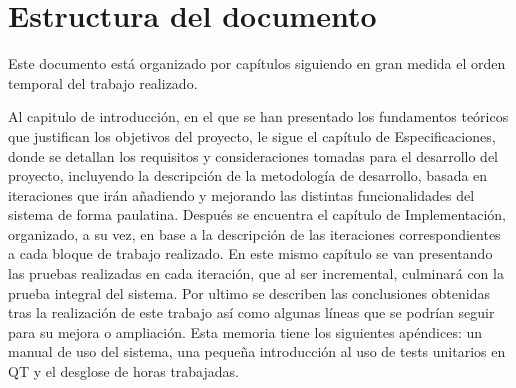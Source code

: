 \section{Estructura del documento}
Este documento está organizado por capítulos siguiendo en gran medida el orden temporal del trabajo realizado. 

Al capitulo de introducción, en el que se han presentado los fundamentos teóricos que justifican los objetivos del proyecto, le sigue el capítulo de Especificaciones, donde se detallan los requisitos y consideraciones tomadas para el desarrollo del proyecto, incluyendo la descripción de la metodología de desarrollo, basada en iteraciones que irán añadiendo y mejorando las distintas funcionalidades del sistema de forma paulatina. Después se encuentra el capítulo de Implementación, organizado, a su vez, en base a la descripción de las iteraciones correspondientes a cada bloque de trabajo realizado. En este mismo capítulo se van presentando las pruebas realizadas en cada iteración, que al ser incremental, culminará con la prueba integral del sistema. Por ultimo se describen las conclusiones obtenidas tras la realización de este trabajo así como algunas líneas que se podrían seguir para su mejora o ampliación. Esta memoria tiene los siguientes apéndices: un manual de uso del sistema, una pequeña introducción al uso de tests unitarios en QT y el desglose de horas trabajadas.

\chapterend

